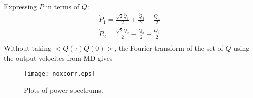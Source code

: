 Expressing $P$ in terms of $Q$:
\begin{align}
\dot{P}_1=\frac{\sqrt{2}\dot{Q}_1}{2}+\frac{\dot{Q}_3}{2}-\frac{\dot{Q}_4}{2}\\
\dot{P}_2=\frac{\sqrt{2}\dot{Q}_2}{2}-\frac{\dot{Q}_3}{2}-\frac{\dot{Q}_4}{2}\\
\end{align}
Without taking $<\dot{Q}(\tau)\dot{Q}(0)>$, the Fourier transform of the set of $\dot{Q}$ using the output velocites from MD gives
\begin{figure}[!h]
\centering
\texttt{[image: noxcorr.eps]}
\caption{Plots of power spectrums.}
\label{fig:awesome_image}
\end{figure}

